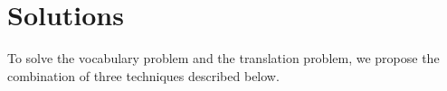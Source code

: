 \documentclass[manuscript,screen,review]{acmart}
\begin{document}
\section{Solutions}


To solve the vocabulary problem and the translation problem,
we propose the combination of three techniques described below.
\end{document}
